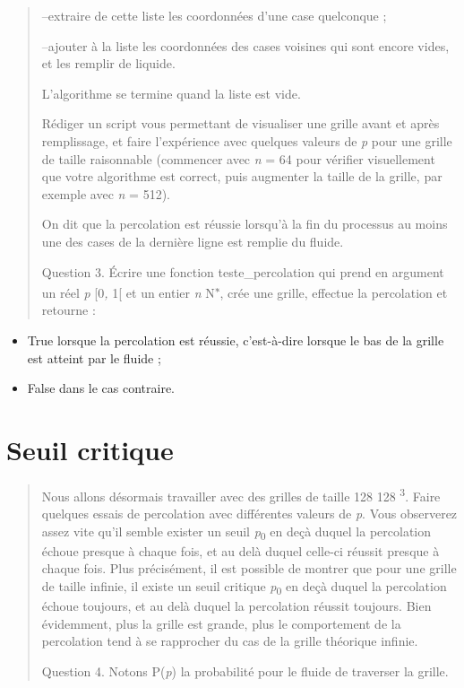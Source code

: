 \documentclass[]{article}
\begin{document}
\begin{quote}
--extraire de cette liste les coordonnées d'une case quelconque ;

--ajouter à la liste les coordonnées des cases voisines qui sont encore
vides, et les remplir de liquide.

L'algorithme se termine quand la liste est vide.

Rédiger un script vous permettant de visualiser une grille avant et
après remplissage, et faire l'expérience avec quelques valeurs de
\emph{p} pour une grille de taille raisonnable (commencer avec \emph{n}
= 64 pour vérifier visuellement que votre algorithme est correct, puis
augmenter la taille de la grille, par exemple avec \emph{n} = 512).

On dit que la percolation est réussie lorsqu'à la fin du processus au
moins une des cases de la dernière ligne est remplie du fluide.

Question 3. Écrire une fonction teste\_percolation qui prend en argument
un réel \emph{p} {[}0\emph{,} 1{[} et un entier \emph{n}
N\textsuperscript{∗}, crée une grille, effectue la percolation et
retourne :
\end{quote}

\begin{itemize}
\item
  True lorsque la percolation est réussie, c'est-à-dire lorsque le bas
  de la grille est atteint par le fluide ;
\item
  False dans le cas contraire.
\end{itemize}

\section{Seuil critique}\label{seuil-critique}

\begin{quote}
Nous allons désormais travailler avec des grilles de taille 128 128
\textsuperscript{3}. Faire quelques essais de percolation avec
différentes valeurs de \emph{p}. Vous observerez assez vite qu'il semble
exister un seuil \emph{p}\textsubscript{0} en deçà duquel la percolation
échoue presque à chaque fois, et au delà duquel celle-ci réussit presque
à chaque fois. Plus précisément, il est possible de montrer que pour une
grille de taille infinie, il existe un seuil critique
\emph{p}\textsubscript{0} en deçà duquel la percolation échoue toujours,
et au delà duquel la percolation réussit toujours. Bien évidemment, plus
la grille est grande, plus le comportement de la percolation tend à se
rapprocher du cas de la grille théorique infinie.

Question 4. Notons P(\emph{p}) la probabilité pour le fluide de
traverser la grille.
\end{quote}
\end{document}
